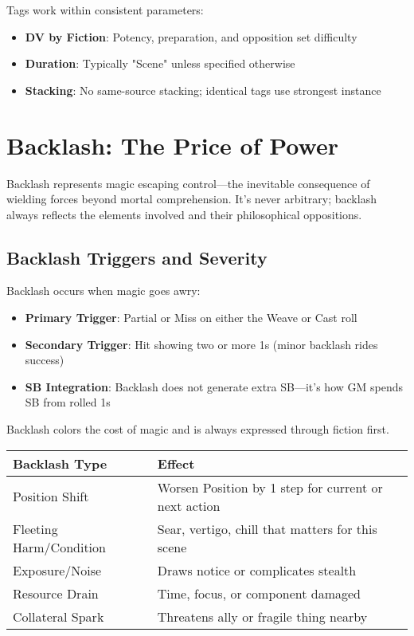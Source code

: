 Tags work within consistent parameters:
\begin{itemize}
    \item \textbf{DV by Fiction}: Potency, preparation, and opposition set difficulty
    \item \textbf{Duration}: Typically "Scene" unless specified otherwise
    \item \textbf{Stacking}: No same-source stacking; identical tags use strongest instance
\end{itemize}

\section*{Backlash: The Price of Power}

Backlash represents magic escaping control—the inevitable consequence of wielding forces beyond mortal comprehension. It's never arbitrary; backlash always reflects the elements involved and their philosophical oppositions.

\subsection*{Backlash Triggers and Severity}

Backlash occurs when magic goes awry:
\begin{itemize}
    \item \textbf{Primary Trigger}: Partial or Miss on either the Weave or Cast roll
    \item \textbf{Secondary Trigger}: Hit showing two or more 1s (minor backlash rides success)
    \item \textbf{SB Integration}: Backlash does not generate extra SB—it's how GM spends SB from rolled 1s
\end{itemize}

Backlash colors the cost of magic and is always expressed through fiction first.

\begin{fatebox}
\begin{tabularx}{\textwidth}{lX}
\toprule
\textbf{Backlash Type} & \textbf{Effect} \\
\midrule
Position Shift & Worsen Position by 1 step for current or next action \\
Fleeting Harm/Condition & Sear, vertigo, chill that matters for this scene \\
Exposure/Noise & Draws notice or complicates stealth \\
Resource Drain & Time, focus, or component damaged \\
Collateral Spark & Threatens ally or fragile thing nearby \\
\bottomrule
\end{tabularx}
\end{fatebox}


